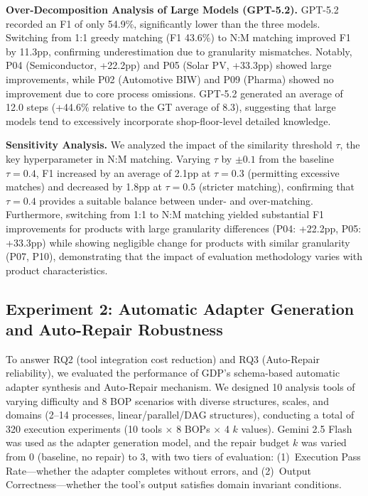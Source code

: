 \documentclass[conference]{IEEEtran}
\begin{document}
\textbf{Over-Decomposition Analysis of Large Models (GPT-5.2).}
GPT-5.2 recorded an F1 of only 54.9\%, significantly lower than the three models. Switching from 1:1 greedy matching (F1 43.6\%) to N:M matching improved F1 by 11.3pp, confirming underestimation due to granularity mismatches. Notably, P04 (Semiconductor, +22.2pp) and P05 (Solar PV, +33.3pp) showed large improvements, while P02 (Automotive BIW) and P09 (Pharma) showed no improvement due to core process omissions. GPT-5.2 generated an average of 12.0 steps (+44.6\% relative to the GT average of 8.3), suggesting that large models tend to excessively incorporate shop-floor-level detailed knowledge.

\textbf{Sensitivity Analysis.}
We analyzed the impact of the similarity threshold $\tau$, the key hyperparameter in N:M matching. Varying $\tau$ by $\pm0.1$ from the baseline $\tau{=}0.4$, F1 increased by an average of 2.1pp at $\tau{=}0.3$ (permitting excessive matches) and decreased by 1.8pp at $\tau{=}0.5$ (stricter matching), confirming that $\tau{=}0.4$ provides a suitable balance between under- and over-matching. Furthermore, switching from 1:1 to N:M matching yielded substantial F1 improvements for products with large granularity differences (P04: +22.2pp, P05: +33.3pp) while showing negligible change for products with similar granularity (P07, P10), demonstrating that the impact of evaluation methodology varies with product characteristics.

\subsection{Experiment 2: Automatic Adapter Generation and Auto-Repair Robustness}

To answer RQ2 (tool integration cost reduction) and RQ3 (Auto-Repair reliability), we evaluated the performance of GDP's schema-based automatic adapter synthesis and Auto-Repair mechanism. We designed 10 analysis tools of varying difficulty and 8 BOP scenarios with diverse structures, scales, and domains (2--14 processes, linear/parallel/DAG structures), conducting a total of 320 execution experiments (10 tools $\times$ 8 BOPs $\times$ 4 $k$ values). Gemini 2.5 Flash was used as the adapter generation model, and the repair budget $k$ was varied from 0 (baseline, no repair) to 3, with two tiers of evaluation: (1)~Execution Pass Rate---whether the adapter completes without errors, and (2)~Output Correctness---whether the tool's output satisfies domain invariant conditions.
\end{document}
